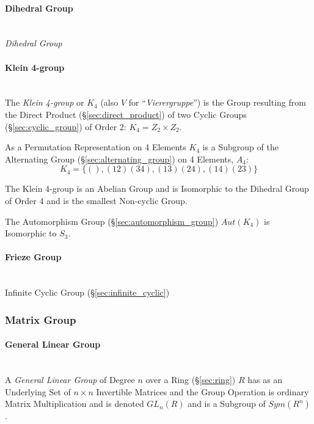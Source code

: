 \paragraph{Dihedral Group}\label{sec:dihedral_group}
\hfill \\
\emph{Dihedral Group}


\paragraph{Klein 4-group}\label{sec:klein_4group}
\hfill \\

The \emph{Klein 4-group} or $K_4$ (also $V$ for
``\emph{Vierergruppe}'') is the Group resulting from the Direct
Product (\S\ref{sec:direct_product}) of two Cyclic Groups
(\S\ref{sec:cyclic_group}) of Order 2: $K_4 = Z_2 \times Z_2$.

As a Permutation Representation on 4 Elements $K_4$ is a Subgroup of
the Alternating Group (\S\ref{sec:alternating_group}) on 4 Elements,
$A_4$:
\[
    K_4 = \{ (), (12)(34), (13)(24), (14)(23) \}
\]

The Klein 4-group is an Abelian Group and is Isomorphic to the
Dihedral Group of Order 4 and is the smallest Non-cyclic Group.

The Automorphism Group (\S\ref{sec:automorphism_group}) $Aut(K_4)$ is
Isomorphic to $S_3$.



\paragraph{Frieze Group}\label{sec:frieze_group}
\hfill \\
Infinite Cyclic Group (\S\ref{sec:infinite_cyclic})



\subsubsection{Matrix Group}\label{sec:matrix_group}

\paragraph{General Linear Group}\label{sec:general_linear_group}

\hfill \\ A \emph{General Linear Group} of Degree $n$ over a Ring
(\S\ref{sec:ring}) $R$ has as an Underlying Set of $n \times n$
Invertible Matrices and the Group Operation is ordinary Matrix
Multiplication and is denoted $GL_n(R)$ and is a Subgroup of
$Sym(R^n)$.



